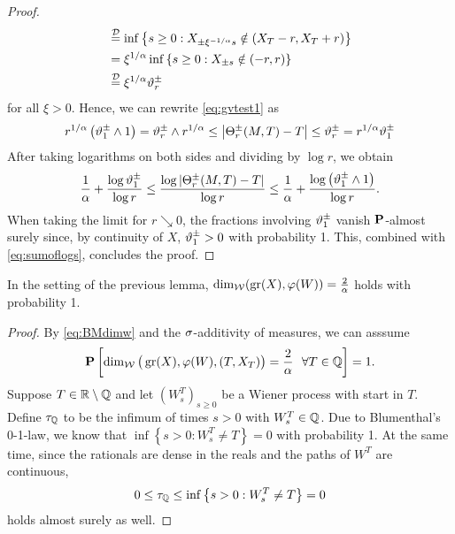 \begin{proof}
\begin{align*}
     &\stackrel{\mathcal{D}}{=}\inf\left\{s\geq0:X_{\pm\xi^{-1/\alpha}s}
         \notin (X_T-r,X_T+r)\right\}\\
     &=\xi^{1/\alpha}\inf\left\{s\geq0:X_{\pm s}\notin(-r,r)\right\}\\
     &\stackrel{\mathcal{D}}{=}\xi^{1/\alpha}\vartheta_r^{\pm}
  \end{align*}
  for all $\xi>0$. Hence, we can rewrite \eqref{eq:gvtest1} as
  \begin{equation}\label{eq:gvtest2}
    r^{1/\alpha}\left(\vartheta_1^\pm\wedge 1\right)
    =\vartheta_r^\pm\wedge r^{1/\alpha}
    \leq \left|\Theta^\pm_r(M,T)-T\right|
    \leq \vartheta_r^{\pm}
    =r^{1/\alpha}\vartheta_1^\pm
  \end{equation}
  After taking logarithms on both sides and dividing by $\log r$, we obtain
  \[
    \frac{1}{\alpha}+\frac{\log \vartheta^\pm_1}{\log r}
    \leq \frac{\log \left|\Theta^\pm_r(M,T)-T\right|}{\log r}
    \leq \frac{1}{\alpha}+\frac{\log \left(\vartheta_1^\pm\wedge 1\right)}
      {\log r}.
  \]
  When taking the limit for $r\searrow 0$, the fractions involving 
  $\vartheta_1^\pm$ vanish $\mathbf{P}$-almost surely since, by continuity of 
  $X$, $\vartheta_1^\pm>0$ with probability 1. This, combined with \eqref{eq:sumoflogs}, concludes the proof.
\end{proof}
\begin{lem}
  In the setting of the previous lemma, $\dim_{\mathcal{W}}(\operatorname{gr}(X),\varphi(W))=\frac{2}{\alpha}$ holds with probability 1.
\end{lem}
\begin{proof}
  By \eqref{eq:BMdimw} and the $\sigma$-additivity of measures, we can asssume 
  \[
    \Prob\left[\dimw\big(\gr(X),\gp(W),(T,X_T)\big)=\frac{2}{\ga}\ \ 
     \forall T\in\IQ\right]=1.
  \]
  Suppose $T\in\mathbb{R}\setminus\mathbb{Q}$ and let $\left(W^T_s\right)_{s\geq0}$ be a Wiener process with start in $T$. Define $\tau_{\mathbb{Q}}$ to be the infimum of times $s>0$ with $W_s^T\in\mathbb{Q}$. Due to Blumenthal's 0-1-law, we know that $\inf\left\{s>0:W_s^T\neq T\right\}=0$ with probability 1. At the same time, since the rationals are dense in the reals and the paths of $W^T$ are continuous, 
  \[
    0\leq\tau_{\mathbb{Q}}\leq \inf\left\{s>0:W_s^T\neq T\right\}=0
  \]
  holds almost surely as well. 
\end{proof}

